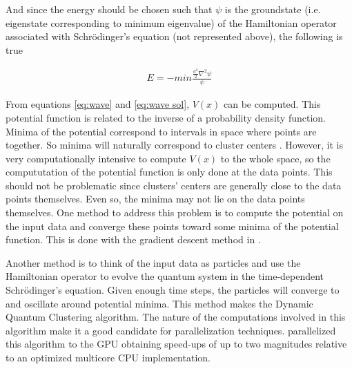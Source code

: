 And since the energy should be chosen such that $\psi$ is the groundstate (i.e. eigenstate corresponding to minimum eigenvalue) of the Hamiltonian operator associated with Schrödinger's equation (not represented above), the following is true

\begin{align}
E = - min \frac {\frac{\sigma^2}{2}\nabla^2 \psi }{\psi}
\label{eq:wave sol}
\end{align}

From equations \ref{eq:wave} and \ref{eq:wave sol}, $V(x)$ can be computed.
This potential function is related to the inverse of a probability density function.
Minima of the potential correspond to intervals in space where points are together.
So minima will naturally correspond to cluster centers \cite{Horn2001a}.
However, it is very computationally intensive to compute $V(x)$ to the whole space, so the compututation of the potential function is only done at the data points.
This should not be problematic since clusters' centers are generally close to the data points themselves. 
Even so, the minima may not lie on the data points themselves.
One method to address this problem is to compute the potential on the input data and converge these points toward some minima of the potential function.
This is done with the gradient descent method in \cite{Horn2001a}. 

Another method \cite{Weinstein2009} is to think of the input data as particles and use the Hamiltonian operator to evolve the quantum system in the time-dependent Schrödinger's equation.
Given enough time steps, the particles will converge to and oscillate around potential minima.
This method makes the Dynamic Quantum Clustering algorithm.
The nature of the computations involved in this algorithm make it a good candidate for parallelization techniques.
\citet{Wittek2013} parallelized this algorithm to the GPU obtaining speed-ups of up to two magnitudes relative to an optimized multicore CPU implementation. %


%


